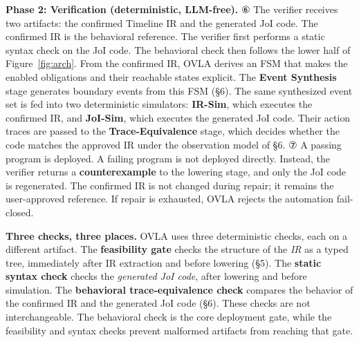 \documentclass[sigconf,nonacm,anonymous,review]{acmart}
\begin{document}
\textbf{Phase 2: Verification (deterministic, LLM-free).} ⑥ The verifier receives two artifacts: the confirmed Timeline IR and the generated JoI code. The confirmed IR is the behavioral reference. The verifier first performs a static syntax check on the JoI code. The behavioral check then follows the lower half of Figure~\ref{fig:arch}. From the confirmed IR, OVLA derives an FSM that makes the enabled obligations and their reachable states explicit. The \textbf{Event Synthesis} stage generates boundary events from this FSM (\S6). The same synthesized event set is fed into two deterministic simulators: \textbf{IR-Sim}, which executes the confirmed IR, and \textbf{JoI-Sim}, which executes the generated JoI code. Their action traces are passed to the \textbf{Trace-Equivalence} stage, which decides whether the code matches the approved IR under the observation model of \S6. ⑦ A passing program is deployed. A failing program is not deployed directly. Instead, the verifier returns a \textbf{counterexample} to the lowering stage, and only the JoI code is regenerated. The confirmed IR is not changed during repair; it remains the user-approved reference. If repair is exhausted, OVLA rejects the automation fail-closed.

\textbf{Three checks, three places.} OVLA uses three deterministic checks, each on a different artifact. The \textbf{feasibility gate} checks the structure of the \emph{IR} as a typed tree, immediately after IR extraction and before lowering (\S5). The \textbf{static syntax check} checks the \emph{generated JoI code}, after lowering and before simulation. The \textbf{behavioral trace-equivalence check} compares the behavior of the confirmed IR and the generated JoI code (\S6). These checks are not interchangeable. The behavioral check is the core deployment gate, while the feasibility and syntax checks prevent malformed artifacts from reaching that gate.
\end{document}

